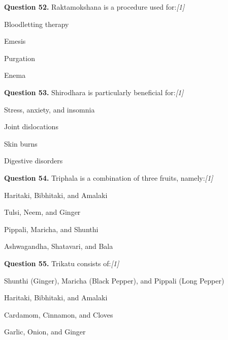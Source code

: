 \documentclass[11pt,a4paper]{article}
\newcommand{\pts}[1]{\hfill   \textit{[#1]}}
\begin{document}
\medskip




\noindent   \textbf{Question 52.} Raktamokshana is a procedure used for:\pts{1}

\begin{parts}
  \item Bloodletting therapy
  \item Emesis
  \item Purgation
  \item Enema
\end{parts}

\medskip




\noindent   \textbf{Question 53.} Shirodhara is particularly beneficial for:\pts{1}

\begin{parts}
  \item Stress, anxiety, and insomnia
  \item Joint dislocations
  \item Skin burns
  \item Digestive disorders
\end{parts}

\medskip




\noindent   \textbf{Question 54.} Triphala is a combination of three fruits, namely:\pts{1}

\begin{parts}
  \item Haritaki, Bibhitaki, and Amalaki
  \item Tulsi, Neem, and Ginger
  \item Pippali, Maricha, and Shunthi
  \item Ashwagandha, Shatavari, and Bala
\end{parts}

\medskip




\noindent   \textbf{Question 55.} Trikatu consists of:\pts{1}

\begin{parts}
  \item Shunthi (Ginger), Maricha (Black Pepper), and Pippali (Long Pepper)
  \item Haritaki, Bibhitaki, and Amalaki
  \item Cardamom, Cinnamon, and Cloves
  \item Garlic, Onion, and Ginger
\end{parts}
\end{document}
